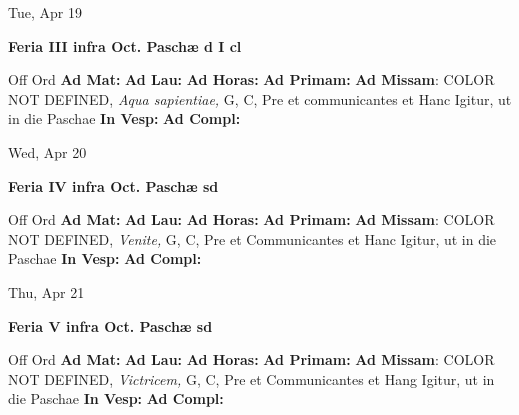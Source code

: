\documentclass[10pt]{memoir}
\begin{document}
\begin{center}
\begin{minipage}{3.5in}
\vspace{2em}
\begin{center}Tue, Apr 19
\end{center}
\textbf{ \large Feria III infra Oct. Paschæ
\textnormal{\normalsize d I cl}}

\begin{justify}Off Ord
\textbf{Ad Mat: }
\textbf{Ad Lau: }
\textbf{Ad Horas: }
\textbf{Ad Primam: }\textbf{Ad Missam}: COLOR NOT DEFINED, \textit{Aqua sapientiae,} G, C, Pre et communicantes et Hanc Igitur, ut in die Paschae
\textbf{In Vesp: }
\textbf{Ad Compl: }
\end{justify}
\end{minipage}
\end{center}

\begin{center}
\begin{minipage}{3.5in}
\vspace{2em}
\begin{center}Wed, Apr 20
\end{center}
\textbf{ \large Feria IV infra Oct. Paschæ
\textnormal{\normalsize sd}}

\begin{justify}Off Ord
\textbf{Ad Mat: }
\textbf{Ad Lau: }
\textbf{Ad Horas: }
\textbf{Ad Primam: }\textbf{Ad Missam}: COLOR NOT DEFINED, \textit{Venite,} G, C, Pre et Communicantes et Hanc Igitur, ut in die Paschae
\textbf{In Vesp: }
\textbf{Ad Compl: }
\end{justify}
\end{minipage}
\end{center}

\begin{center}
\begin{minipage}{3.5in}
\vspace{2em}
\begin{center}Thu, Apr 21
\end{center}
\textbf{ \large Feria V infra Oct. Paschæ
\textnormal{\normalsize sd}}

\begin{justify}Off Ord
\textbf{Ad Mat: }
\textbf{Ad Lau: }
\textbf{Ad Horas: }
\textbf{Ad Primam: }\textbf{Ad Missam}: COLOR NOT DEFINED, \textit{Victricem,} G, C, Pre et Communicantes et Hang Igitur, ut in die Paschae
\textbf{In Vesp: }
\textbf{Ad Compl: }
\end{justify}
\end{minipage}
\end{center}
\end{document}
